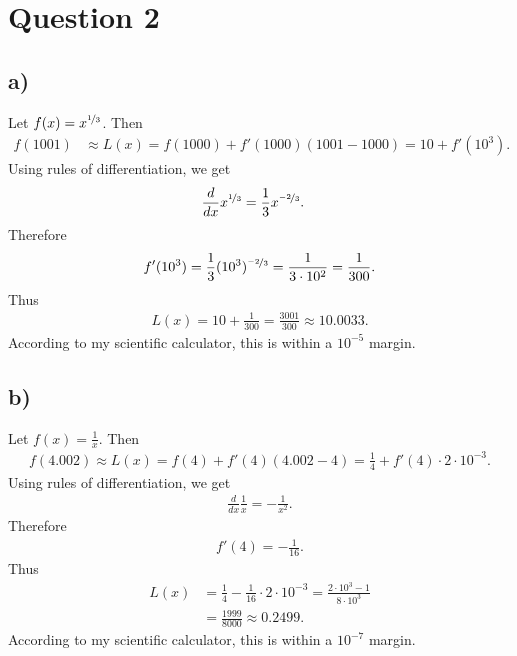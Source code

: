 \documentclass{article}
\begin{document}
\section*{Question 2}
\subsection*{a)}
Let $f(x)=x^{\nicefrac{1}{3}}$. Then
\begin{align*}
  f(1001) & \approx L(x)= f(1000)+f'(1000)(1001-1000)=10+f'(10^3).
\end{align*}
Using rules of differentiation, we get
\begin{align*}
  \frac{d}{dx}x^{\nicefrac{1}{3}} & =\frac{1}{3}x^{\nicefrac{-2}{3}}.
\end{align*}
Therefore
\begin{align*}
  f'(10^3)=\frac{1}{3}(10^3)^{\nicefrac{-2}{3}}=\frac{1}{3\cdot10^2}=\frac{1}{300}.
\end{align*}
Thus
\begin{align*}
  L(x)=10+\frac{1}{300}=\frac{3001}{300}\approx10.0033.
\end{align*}
According to my scientific calculator, this is within a $10^{-5}$ margin.
\subsection*{b)}
Let $f(x)=\frac{1}{x}$. Then
\begin{align*}
  f(4.002)\approx L(x)=f(4)+f'(4)(4.002-4)=\frac{1}{4}+f'(4)\cdot2\cdot10^{-3}.
\end{align*}
Using rules of differentiation, we get
\begin{align*}
  \frac{d}{dx}\frac{1}{x}=-\frac{1}{x^2}.
\end{align*}
Therefore
\begin{align*}
  f'(4)=-\frac{1}{16}.
\end{align*}
Thus
\begin{align*}
  L(x) & =\frac{1}{4}-\frac{1}{16}\cdot 2\cdot 10^{-3}=\frac{2\cdot 10^3-1}{8\cdot10^3} \\
       & =\frac{1999}{8000}\approx0.2499.
\end{align*}
According to my scientific calculator, this is within a $10^{-7}$ margin.
\end{document}
